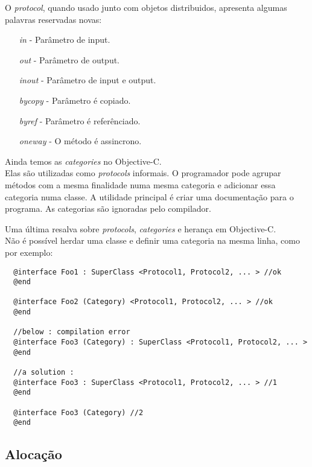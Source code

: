 \documentclass[brazil]{beamer}
\begin{document}
\begin{frame}
  O \textit{protocol}, quando usado junto com objetos distribuidos, apresenta algumas palavras reservadas novas:
  \begin{itemize}
    \item[\textit{in}] - Parâmetro de input.
    \item[\textit{out}] - Parâmetro de output.
    \item[\textit{inout}] - Parâmetro de input e output.
    \item[\textit{bycopy}] - Parâmetro é copiado.
    \item[\textit{byref}] - Parâmetro é referênciado.
    \item[\textit{oneway}] - O método é assincrono.
  \end{itemize}
\end{frame}

\begin{frame}
  Ainda temos as \textit{categories} no Objective-C. \\
  Elas são utilizadas como \textit{protocols} informais. O programador pode agrupar métodos com a mesma finalidade numa mesma categoria e adicionar essa categoria
  numa classe. A utilidade principal é criar uma documentação para o programa. As categorias são ignoradas pelo compilador.
\end{frame}

\begin{frame}[fragile]
  Uma última resalva sobre \textit{protocols}, \textit{categories} e herança em Objective-C. \\
  Não é possível herdar uma classe e definir uma categoria na mesma linha, como por exemplo:
  \lstset{language=C++,basicstyle=\scriptsize}
  \begin{lstlisting}
  @interface Foo1 : SuperClass <Protocol1, Protocol2, ... > //ok
  @end
  
  @interface Foo2 (Category) <Protocol1, Protocol2, ... > //ok
  @end
  
  //below : compilation error
  @interface Foo3 (Category) : SuperClass <Protocol1, Protocol2, ... >
  @end
  
  //a solution :
  @interface Foo3 : SuperClass <Protocol1, Protocol2, ... > //1
  @end
  
  @interface Foo3 (Category) //2
  @end
  \end{lstlisting}
\end{frame}

\subsection{Alocação}
\end{document}
